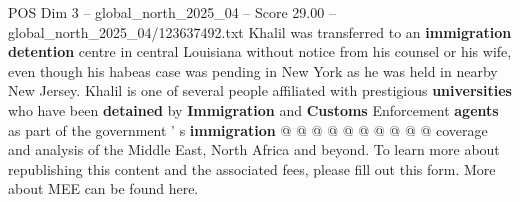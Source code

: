\begin{textsample}{POS Dim 3 – global\_north\_2025\_04 – Score 29.00 – global\_north\_2025\_04/123637492.txt}
Khalil was transferred to an \textbf{immigration} \textbf{detention} centre in central Louisiana without notice from his counsel or his wife, even though his habeas case was pending in New York as he was held in nearby New Jersey.
Khalil is one of several people affiliated with prestigious \textbf{universities} who have been \textbf{detained} by \textbf{Immigration} and \textbf{Customs} Enforcement \textbf{agents} as part of the government ' s \textbf{immigration} @ @ @ @ @ @ @ @ @ @ coverage and analysis of the Middle East, North Africa and beyond.
To learn more about republishing this content and the associated fees, please fill out this form.
More about MEE can be found here.

\end{textsample}
